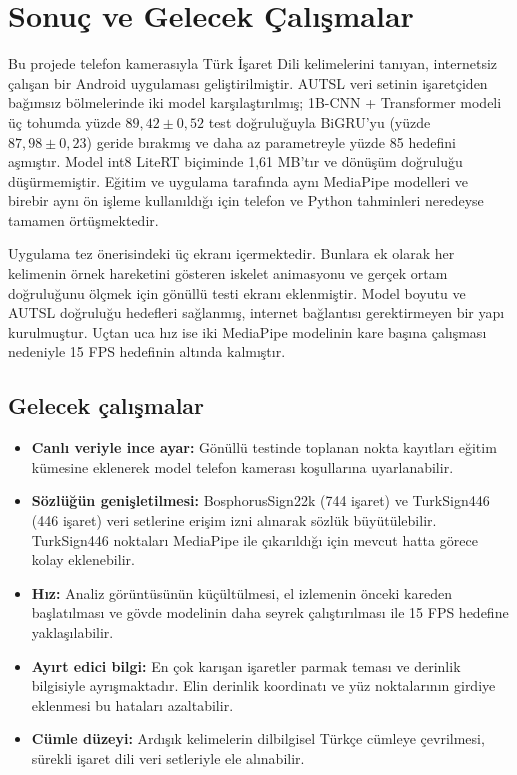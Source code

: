 \section{Sonuç ve Gelecek Çalışmalar}
\label{CH:Sonuc}

Bu projede telefon kamerasıyla Türk İşaret Dili kelimelerini tanıyan, internetsiz
çalışan bir Android uygulaması geliştirilmiştir. AUTSL veri setinin işaretçiden
bağımsız bölmelerinde iki model karşılaştırılmış; 1B-CNN + Transformer modeli üç
tohumda yüzde $89{,}42 \pm 0{,}52$ test doğruluğuyla BiGRU'yu (yüzde
$87{,}98 \pm 0{,}23$) geride bırakmış ve daha az parametreyle yüzde 85 hedefini
aşmıştır. Model int8 LiteRT biçiminde 1,61 MB'tır ve dönüşüm doğruluğu
düşürmemiştir. Eğitim ve uygulama tarafında aynı MediaPipe modelleri ve birebir aynı
ön işleme kullanıldığı için telefon ve Python tahminleri neredeyse tamamen
örtüşmektedir.

Uygulama tez önerisindeki üç ekranı içermektedir. Bunlara ek olarak her kelimenin
örnek hareketini gösteren iskelet animasyonu ve gerçek ortam doğruluğunu ölçmek için
gönüllü testi ekranı eklenmiştir. Model boyutu ve AUTSL doğruluğu hedefleri
sağlanmış, internet bağlantısı gerektirmeyen bir yapı kurulmuştur. Uçtan uca hız ise
iki MediaPipe modelinin kare başına çalışması nedeniyle 15 FPS hedefinin altında
kalmıştır.

\subsection*{Gelecek çalışmalar}

\begin{itemize}
  \item \textbf{Canlı veriyle ince ayar:} Gönüllü testinde toplanan nokta kayıtları
        eğitim kümesine eklenerek model telefon kamerası koşullarına uyarlanabilir.
  \item \textbf{Sözlüğün genişletilmesi:} BosphorusSign22k (744 işaret) ve
        TurkSign446 (446 işaret) veri setlerine erişim izni alınarak sözlük
        büyütülebilir. TurkSign446 noktaları MediaPipe ile çıkarıldığı için mevcut
        hatta görece kolay eklenebilir.
  \item \textbf{Hız:} Analiz görüntüsünün küçültülmesi, el izlemenin önceki kareden
        başlatılması ve gövde modelinin daha seyrek çalıştırılması ile 15 FPS hedefine
        yaklaşılabilir.
  \item \textbf{Ayırt edici bilgi:} En çok karışan işaretler parmak teması ve derinlik
        bilgisiyle ayrışmaktadır. Elin derinlik koordinatı ve yüz noktalarının girdiye
        eklenmesi bu hataları azaltabilir.
  \item \textbf{Cümle düzeyi:} Ardışık kelimelerin dilbilgisel Türkçe cümleye
        çevrilmesi, sürekli işaret dili veri setleriyle ele alınabilir.
\end{itemize}
